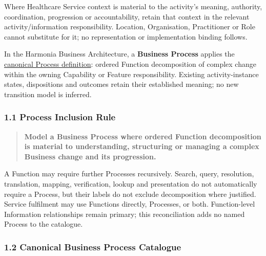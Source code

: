 \label{rad:processes:11}

Where Healthcare Service context is material to the activity's meaning, authority, coordination, progression or accountability, retain that context in the relevant activity/\allowbreak{}information responsibility. Location, Organisation, Practitioner or Role cannot substitute for it; no representation or implementation binding follows.

\label{rad:processes:13}

In the Harmonia Business Architecture, a \textbf{Business Process} applies the \hyperref[rad:metamodel:183]{canonical Process definition}: ordered Function decomposition of complex change within the owning Capability or Feature responsibility. Existing activity-instance states, dispositions and outcomes retain their established meaning; no new transition model is inferred.

\label{rad:processes:19}
\subsubsection*{1.1 Process Inclusion Rule}
\label{rad:processes:20}

\begin{quote}

\textbf{Model a Business Process where ordered Function decomposition is material to understanding, structuring or managing a complex Business change and its progression.}


\end{quote}
\label{rad:processes:24}

A Function may require further Processes recursively. Search, query, resolution, translation, mapping, verification, lookup and presentation do not automatically require a Process, but their labels do not exclude decomposition where justified. Service fulfilment may use Functions directly, Processes, or both. Function-level Information relationships remain primary; this reconciliation adds no named Process to the catalogue.

\label{rad:processes:31}



\label{rad:processes:33}
\subsubsection*{1.2 Canonical Business Process Catalogue}
\label{rad:processes:35}

